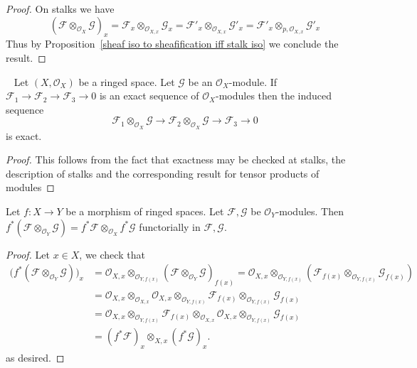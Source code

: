 \begin{proof}
On stalks we have 
\[(\mathscr{F}\otimes_{\mathscr{O}_X}\mathscr{G})_x=\mathscr{F}_x\otimes_{\mathscr{O}_{X,x}}\mathscr{G}_x=\mathscr{F}'_x\otimes_{\mathscr{O}_{X,x}}\mathscr{G}'_x=\mathscr{F}'_x\otimes_{p,\mathscr{O}_{X,x}}\mathscr{G}'_x\]
Thus by Proposition~\ref{sheaf iso to sheafification iff stalk iso} we conclude the result.
\end{proof}
\begin{proposition}~\label{sheaf module tensor exact}
Let $(X,\mathscr{O}_X)$ be a ringed space. Let $\mathscr{G}$ be an $\mathscr{O}_X$-module. If $\mathscr{F}_1\to\mathscr{F}_2\to\mathscr{F}_3\to 0$ is an exact sequence of $\mathscr{O}_X$-modules then the induced sequence
\[\mathscr{F}_1\otimes_{\mathscr{O}_X}\mathscr{G}\to\mathscr{F}_2\otimes_{\mathscr{O}_X}\mathscr{G}\to\mathscr{F}_3\to 0\]
is exact.
\end{proposition}
\begin{proof}
This follows from the fact that exactness may be checked at stalks, the description of stalks and the corresponding result for tensor products of modules
\end{proof}
\begin{proposition}\label{sheaf tensor pull back}
Let $f:X\to Y$ be a morphism of ringed spaces. Let $\mathscr{F},\mathscr{G}$ be $\mathscr{O}_Y$-modules. Then $f^*(\mathscr{F}\otimes_{\mathscr{O}_Y}\mathscr{G})=f^*\mathscr{F}\otimes_{\mathscr{O}_X}f^*\mathscr{G}$ functorially in $\mathscr{F},\mathscr{G}$.
\end{proposition}
\begin{proof}
Let $x\in X$, we check that
\begin{align*}
\big(f^*(\mathscr{F}\otimes_{\mathscr{O}_Y}\mathscr{G})\big)_x&=\mathscr{O}_{X,x}\otimes_{\mathscr{O}_{Y,f(x)}}(\mathscr{F}\otimes_{\mathscr{O}_Y}\mathscr{G})_{f(x)}=\mathscr{O}_{X,x}\otimes_{\mathscr{O}_{Y,f(x)}}(\mathscr{F}_{f(x)}\otimes_{\mathscr{O}_{Y,f(x)}}\mathscr{G}_{f(x)})\\
&=\mathscr{O}_{X,x}\otimes_{\mathscr{O}_{X,x}}\mathscr{O}_{X,x}\otimes_{\mathscr{O}_{Y,f(x)}}\mathscr{F}_{f(x)}\otimes_{\mathscr{O}_{Y,f(x)}}\mathscr{G}_{f(x)}\\
&=\mathscr{O}_{X,x}\otimes_{\mathscr{O}_{Y,f(x)}}\mathscr{F}_{f(x)}\otimes_{\mathscr{O}_{X,x}}\mathscr{O}_{X,x}\otimes_{\mathscr{O}_{Y,f(x)}}\mathscr{G}_{f(x)}\\
&=(f^*\mathscr{F})_x\otimes_{X,x}(f^*\mathscr{G})_x.
\end{align*}
as desired.
\end{proof}
